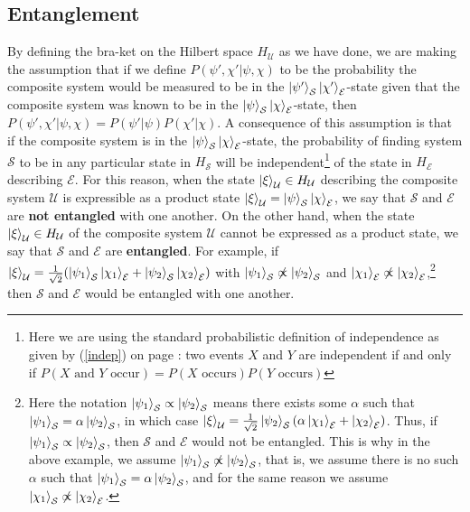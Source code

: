     \subsection{Entanglement}  
     By defining the bra-ket on the Hilbert space $H_\mathcal{U}$ as we have done, we are making the assumption that if we define $P(\psi',\chi'|\psi,\chi)$ to be the probability the composite system would be measured to be in the $\ket{\psi'}_\mathcal{S}\ket{\chi'}_\mathcal{E}$-state given that the composite system was known to be in the $\ket{\psi}_\mathcal{S}\ket{\chi}_\mathcal{E}$-state, then $P(\psi',\chi'|\psi,\chi)=P(\psi'|\psi)P(\chi'|\chi).$ A consequence of this assumption is that if the composite system is in the $\ket{\psi}_\mathcal{S}\ket{\chi}_\mathcal{E}$-state, the probability of finding system $\mathcal{S}$ to be in any particular state in $H_\mathcal{S}$ will be independent\footnote{Here we are using the standard probabilistic definition of independence as given by (\ref{indep}) on page \pageref{indep}: two events $X$ and $Y$ are independent if and only if $P(X \text{ and } Y\text{ occur})=P(X\text{ occurs})P(Y\text{ occurs})$} of the state in $H_\mathcal{E}$ describing $\mathcal{E}$. For this reason, when the state $\ket{\xi}_\mathcal{U}\in H_\mathcal{U}$ describing the composite system $\mathcal{U}$ is expressible as a product state $\ket{\xi}_\mathcal{U}=\ket{\psi}_\mathcal{S}\ket{\chi}_\mathcal{E}$,  we say that $\mathcal{S}$ and $\mathcal{E}$ are \textbf{not entangled} with one another. On the other hand, when  the state $\ket{\xi}_\mathcal{U}\in H_\mathcal{U}$ of the composite system $\mathcal{U}$ cannot be expressed as a product state, we say that $\mathcal{S}$ and $\mathcal{E}$ are \textbf{entangled}.
       For example, if $\ket{\xi}_\mathcal{U}=\frac{1}{\sqrt{2}}(\ket{\psi_1}_\mathcal{S}\ket{\chi_1}_\mathcal{E}+\ket{\psi_2}_\mathcal{S}\ket{\chi_2}_\mathcal{E})$ with $\ket{\psi_1}_\mathcal{S}\not\propto\ket{\psi_2}_\mathcal{S}$ and $\ket{\chi_1}_\mathcal{E}\not\propto\ket{\chi_2}_\mathcal{E}$,\footnote{Here the notation $\ket{\psi_1}_\mathcal{S}\propto\ket{\psi_2}_\mathcal{S}$ means there exists some $\alpha$ such that $\ket{\psi_1}_\mathcal{S}=\alpha\ket{\psi_2}_\mathcal{S}$, in which case $\ket{\xi}_\mathcal{U}=\frac{1}{\sqrt{2}}\ket{\psi_2}_\mathcal{S}(\alpha\ket{\chi_1}_\mathcal{E}+\ket{\chi_2}_\mathcal{E})$. Thus, if  $\ket{\psi_1}_\mathcal{S}\propto\ket{\psi_2}_\mathcal{S}$, then  $\mathcal{S}$ and $\mathcal{E}$ would not be entangled. This is why in the above example, we assume $\ket{\psi_1}_\mathcal{S}\not\propto\ket{\psi_2}_\mathcal{S}$, that is, we assume there is no such $\alpha$ such that $\ket{\psi_1}_\mathcal{S}=\alpha\ket{\psi_2}_\mathcal{S}$, and for the same reason we assume $\ket{\chi_1}_\mathcal{S}\not\propto\ket{\chi_2}_\mathcal{E}$.} then $\mathcal{S}$ and $\mathcal{E}$ would be entangled with one another.
      
